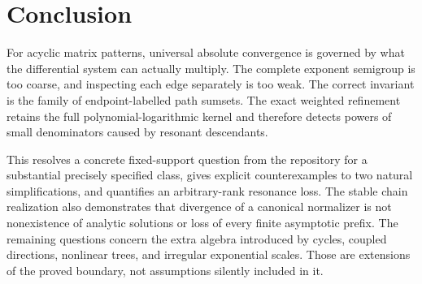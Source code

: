 \documentclass[11pt,a4paper]{article}
\numberwithin{equation}{section}
\theoremstyle{definition}
\theoremstyle{remark}
\begin{document}
\section{Conclusion}

For acyclic matrix patterns, universal absolute convergence is governed by
what the differential system can actually multiply. The complete exponent
semigroup is too coarse, and inspecting each edge separately is too weak.
The correct invariant is the family of endpoint-labelled path sumsets.
The exact weighted refinement retains the full polynomial-logarithmic
kernel and therefore detects powers of small denominators caused by
resonant descendants.

This resolves a concrete fixed-support question from the repository for a
substantial precisely specified class, gives explicit counterexamples to
two natural simplifications, and quantifies an arbitrary-rank resonance
loss. The stable chain realization also demonstrates that divergence of
a canonical normalizer is not nonexistence of analytic solutions or loss
of every finite asymptotic prefix. The remaining questions concern the
extra algebra introduced by cycles, coupled directions, nonlinear trees,
and irregular exponential scales. Those are extensions of the proved
boundary, not assumptions silently included in it.
\end{document}
